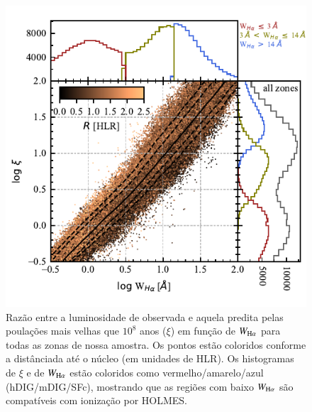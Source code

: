 
\begin{figure}
 \includegraphics[scale=1.5]{figuras/fig_logxi_logWHa_histograms.pdf}
 \caption[$\log \xi \times \log {\rm H}\alpha$]
 {Razão entre a luminosidade de \Ha observada e aquela predita pelas poulações mais velhas que $10^8$ anos ($\xi$) em função de $W_{\Ha}$ para todas as zonas de nossa amostra. Os pontos estão coloridos conforme a distânciada até o núcleo (em unidades de HLR). Os histogramas de $\xi$ e de $W_{\Ha}$ estão coloridos como vermelho/amarelo/azul (hDIG/mDIG/SFc), mostrando que as regiões com baixo $W_{\Ha}$ são compatíveis com ionização por HOLMES.}
 \label{fig:WHa-Xi}
\end{figure}

